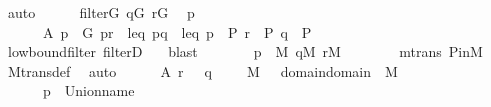 \begin{isabellebody}
\ auto\isanewline
\ \ \ \ \isamarkupfalse%
\ {\isacartoucheopen}filter{\isacharparenleft}{\kern0pt}G{\isacharparenright}{\kern0pt}{\isacartoucheclose}\ {\isacartoucheopen}q{\isasymin}G{\isacartoucheclose}\ {\isacartoucheopen}r{\isasymin}G{\isacartoucheclose}\ \isamarkupfalse%
\ p\ \isanewline
\ \ \ \ \ \ A{\isacharcolon}{\kern0pt}\ {\isachardoublequoteopen}p\ {\isasymin}\ G{\isachardoublequoteclose}\ {\isachardoublequoteopen}{\isasymlangle}p{\isacharcomma}{\kern0pt}r{\isasymrangle}\ {\isasymin}\ leq{\isachardoublequoteclose}\ {\isachardoublequoteopen}{\isasymlangle}p{\isacharcomma}{\kern0pt}q{\isasymrangle}\ {\isasymin}\ leq{\isachardoublequoteclose}\ {\isachardoublequoteopen}p\ {\isasymin}\ P{\isachardoublequoteclose}\ {\isachardoublequoteopen}r\ {\isasymin}\ P{\isachardoublequoteclose}\ {\isachardoublequoteopen}q\ {\isasymin}\ P{\isachardoublequoteclose}\isanewline
\ \ \ \ \ \ \isamarkupfalse%
\ low{\isacharunderscore}{\kern0pt}bound{\isacharunderscore}{\kern0pt}filter\ filterD\ \ \isamarkupfalse%
\ blast\isanewline
\ \ \ \ \isamarkupfalse%
\ \isamarkupfalse%
\ {\isachardoublequoteopen}p\ {\isasymin}\ M{\isachardoublequoteclose}\ {\isachardoublequoteopen}q{\isasymin}M{\isachardoublequoteclose}\ {\isachardoublequoteopen}r{\isasymin}M{\isachardoublequoteclose}\isanewline
\ \ \ \ \ \ \isamarkupfalse%
\ mtrans\ P{\isacharunderscore}{\kern0pt}in{\isacharunderscore}{\kern0pt}M\ \isamarkupfalse%
\ M{\isacharunderscore}{\kern0pt}trans{\isacharunderscore}{\kern0pt}def\ \isamarkupfalse%
\ auto\isanewline
\ \ \ \ \isamarkupfalse%
\ A\ {\isacartoucheopen}{\isasymlangle}{\isasymtheta}{\isacharcomma}{\kern0pt}r{\isasymrangle}\ {\isasymin}\ {\isasymsigma}{\isacartoucheclose}\ {\isacartoucheopen}{\isasymlangle}{\isasymsigma}{\isacharcomma}{\kern0pt}q{\isasymrangle}\ {\isasymin}\ {\isasymtau}{\isacartoucheclose}\ {\isacartoucheopen}{\isasymtheta}\ {\isasymin}\ M{\isacartoucheclose}\ {\isacartoucheopen}{\isasymtheta}\ {\isasymin}\ domain{\isacharparenleft}{\kern0pt}{\isasymUnion}{\isacharparenleft}{\kern0pt}domain{\isacharparenleft}{\kern0pt}{\isasymtau}{\isacharparenright}{\kern0pt}{\isacharparenright}{\kern0pt}{\isacharparenright}{\kern0pt}{\isacartoucheclose}\ \ {\isacartoucheopen}{\isasymsigma}{\isasymin}M{\isacartoucheclose}\ \isamarkupfalse%
\isanewline
\ \ \ \ \ \ {\isachardoublequoteopen}{\isasymlangle}{\isasymtheta}{\isacharcomma}{\kern0pt}p{\isasymrangle}\ {\isasymin}\ Union{\isacharunderscore}{\kern0pt}name{\isacharparenleft}{\kern0pt}{\isasymtau}{\isacharparenright}{\kern0pt}{\isachardoublequoteclose}\ \isamarkupfalse%

\end{isabellebody}
